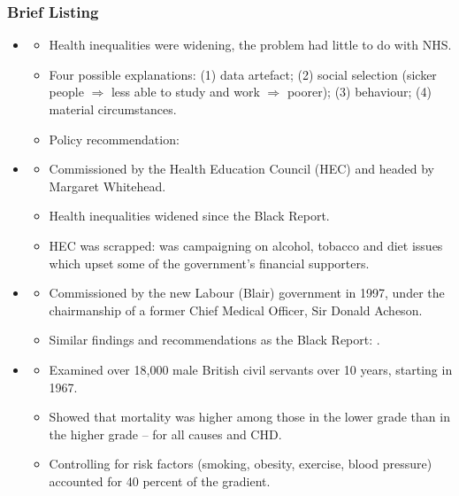         \subsubsection{Brief Listing}
            \begin{itemize}
                \item {}
                \begin{itemize}
                    \item Health inequalities were widening, the problem had little to do with NHS.
                    \item Four possible explanations: (1) data artefact; (2) social selection (sicker people $\Rightarrow$ less able to study and work $\Rightarrow$ poorer); (3) behaviour; (4) material circumstances.
                    \item Policy recommendation: 
                \end{itemize} 
                
                \item {}
                \begin{itemize}
                    \item Commissioned by the Health Education Council (HEC) and headed by
        Margaret Whitehead.
                    \item Health inequalities widened since the Black Report.
                    \item HEC was scrapped: was campaigning on alcohol, tobacco and diet issues which upset some of the government’s financial supporters.
                \end{itemize}
                
                \item {}
                \begin{itemize}
                    \item Commissioned by the new Labour (Blair) government in 1997, under the chairmanship of a former Chief Medical Officer, Sir Donald Acheson.
                    \item Similar findings and recommendations as the Black Report: .
                \end{itemize}
        
                \item {}
                \begin{itemize}
                    \item Examined over 18,000 male British civil servants over 10 years, starting in 1967.
                    \item Showed that mortality was higher among those in the lower grade than in the higher grade – for all causes and CHD.
                    \item Controlling for risk factors (smoking, obesity, exercise, blood pressure) accounted for 40 percent of the gradient.
                \end{itemize}
        

\end{itemize}
